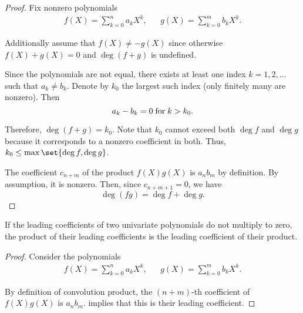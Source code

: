 \begin{proof}
  Fix nonzero polynomials
  \begin{align*}
    f(X) = \sum_{k=0}^n a_k X^k, &&
    g(X) = \sum_{k=0}^m b_k X^k.
  \end{align*}

   Additionally assume that \( f(X) \neq -g(X) \) since otherwise \( f(X) + g(X) = 0 \) and \( \deg(f + g) \) is undefined.

  Since the polynomials are not equal, there exists at least one index \( k = 1, 2, \ldots \) such that \( a_k \neq b_k \). Denote by \( k_0 \) the largest such index (only finitely many are nonzero). Then
  \begin{equation*}
    a_k - b_k = 0 \T{for} k > k_0.
  \end{equation*}

  Therefore, \( \deg(f + g) = k_0 \). Note that \( k_0 \) cannot exceed both \( \deg f \) and \( \deg g \) because it corresponds to a nonzero coefficient in both. Thus, \( k_0 \leq \max\set{ \deg f, \deg g } \).

   The coefficient \( c_{n + m} \) of the product \( f(X) g(X) \) is \( a_n b_m \) by definition. By assumption, it is nonzero. Then, since \( c_{n+m+1} = 0 \), we have
  \begin{equation*}
    \deg (fg) = \deg f + \deg g.
  \end{equation*}
\end{proof}

\begin{corollary}\label{thm:leading_coefficient_of_product}
  If the leading coefficients of two univariate polynomials do not multiply to zero, the product of their leading coefficients is the leading coefficient of their product.
\end{corollary}
\begin{proof}
  Consider the polynomials
  \begin{align*}
    f(X) = \sum_{k=0}^n a_k X^k, &&
    g(X) = \sum_{k=0}^m b_k X^k.
  \end{align*}

  By definition of convolution product, the \( (n + m) \)-th coefficient of \( f(X) g(X) \) is \( a_n b_m \).  implies that this is their leading coefficient.
\end{proof}

